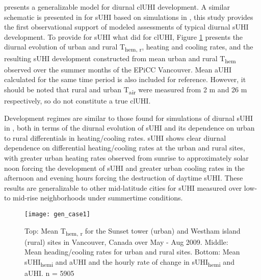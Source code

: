 \begin{bibunit}
\citet{Oke1982} presents a generalizable model for diurnal clUHI development. A similar schematic is presented in \citet{Oke2017} for sUHI based on simulations in \citet{Stewart2014}, this study provides the first observational support of modeled assessments of typical diurnal sUHI development. To provide for sUHI what \citet{Oke1982} did for clUHI, Figure \ref{gen_case} presents the diurnal evolution of urban and rural T\textsubscript{hem, r}, heating and cooling rates, and the resulting sUHI development constructed from mean urban and rural T\textsubscript{hem} observed over the summer months of the EPiCC Vancouver. Mean aUHI calculated for the same time period is also included for reference. However, it should be noted that rural and urban T\textsubscript{air} were measured from 2 \si{\meter} and 26 \si{\meter} respectively, so do not constitute a true clUHI. 

Development regimes are similar to those found for simulations of diurnal sUHI in \citet{Oke2017}, both in terms of the diurnal evolution of sUHI and its dependence on urban to rural differentials in heating/cooling rates. sUHI shows clear diurnal dependence on differential heating/cooling rates at the urban and rural sites, with greater urban heating rates observed from sunrise to approximately solar noon forcing the development of sUHI and greater urban cooling rates in the afternoon and evening hours forcing the destruction of daytime sUHI. These results are generalizable to other mid-latitude cities for sUHI measured over low- to mid-rise neighborhoods under summertime conditions.

\begin{figure}[H]
	\centering
	\texttt{[image: gen\_case1]}
	\caption{Top: Mean T\textsubscript{hem, r} for the Sunset tower (urban) and Westham island (rural) sites in Vancouver, Canada over May - Aug 2009. Middle: Mean heading/cooling rates for urban and rural sites. Bottom: Mean sUHI\textsubscript{hemi} and aUHI and the hourly rate of change in sUHI\textsubscript{hemi} and aUHI.  n = 5905}
	\label{gen_case}
\end{figure}



\end{bibunit}
